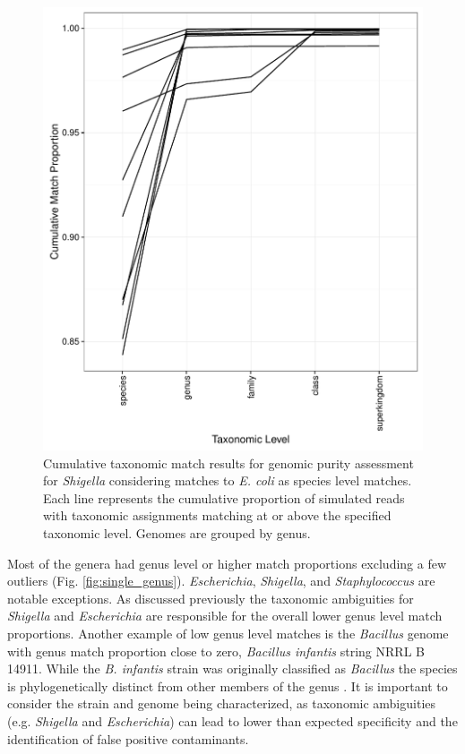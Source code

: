 \documentclass[fleqn,10pt,lineno]{wlpeerj}\usepackage[]{graphicx}\usepackage[]{color}
\makeatletter
\def\maxwidth{ %
  \ifdim\Gin@nat@width>\linewidth
    \linewidth
  \else
    \Gin@nat@width
  \fi
}
\newenvironment{knitrout}{}{} %
\makeatother
\begin{document}
\begin{knitrout}
\color{fgcolor}\begin{figure}

{\centering \includegraphics[width=\maxwidth]{figure/shigella_ec_cum-1} 

}

\caption{Cumulative taxonomic match results for genomic purity assessment for \textit{Shigella} considering matches to \textit{E. coli} as species level matches.  Each line represents the cumulative proportion of simulated reads with taxonomic assignments matching at or above the specified taxonomic level. Genomes are grouped by genus.}\label{fig:shigella_ec_cum}
\end{figure}


\end{knitrout}

Most of the genera had genus level or higher match proportions excluding a few outliers (Fig. \ref{fig:single_genus}). 
\textit{Escherichia}, \textit{Shigella}, and \textit{Staphylococcus} are notable exceptions. 
As discussed previously the taxonomic ambiguities for \textit{Shigella} and \textit{Escherichia} are responsible for the overall lower genus level match proportions. Another example of low genus level matches is the \textit{Bacillus} genome with genus match proportion close to zero, \textit{Bacillus infantis} string NRRL B 14911. While the \textit{B. infantis} strain was originally classified as \textit{Bacillus} the species is phylogenetically distinct from other members of the genus \citep{ko2006bacillus}.
It is important to consider the strain and genome being characterized, as taxonomic ambiguities (e.g. \textit{Shigella} and \textit{Escherichia}) can lead to lower than expected specificity and the identification of false positive contaminants.  
\end{document}
